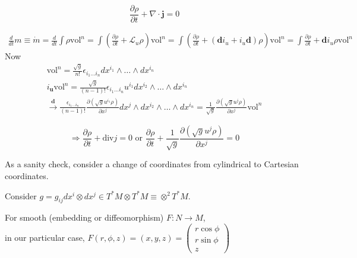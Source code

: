 \documentclass[twoside,landscape,10pt]{amsart}
\theoremstyle{plain}
\theoremstyle{definition}
\theoremstyle{remark}
\theoremstyle{remark}
\begin{document}
\begin{multicols*}{2}
\begin{equation}
  \frac{ \partial \rho }{ \partial t } + \nabla \cdot \mathbf{j} = 0 
\end{equation}

\[
\begin{gathered}
  \frac{d}{dt} m \equiv \dot{m} = \frac{d}{dt} \int \rho \text{vol}^n = \int \left( \frac{ \partial \rho}{ \partial t} + \mathcal{L}_u \rho \right)\text{vol}^n = \int \left( \frac{ \partial \rho }{ \partial t} + (\mathbf{d}i_u + i_u \mathbf{d})\rho \right)\text{vol}^n = \int \frac{ \partial \rho }{ \partial t} + \mathbf{d}i_u \rho \text{vol}^n 
\end{gathered}
\]
Now
\[
\begin{gathered}
  \text{vol}^n = \frac{ \sqrt{g}}{n!} \epsilon_{i_1 \dots i_n} dx^{i_1} \wedge \dots \wedge dx^{i_n} \\ 
  i_{\mathbf{u}} \text{vol}^n = \frac{ \sqrt{g}}{(n-1)!} \epsilon_{i_1 \dots i_n} u^{i_1} dx^{i_2} \wedge \dots \wedge dx^{i_n} \\
  \xrightarrow{ \mathbf{d}} \frac{ \epsilon_{i_1 \dots i_n}}{ (n-1)!} \frac{ \partial (\sqrt{g} u^{i_1} \rho ) }{ \partial x^j} dx^j \wedge dx^{i_2} \wedge \dots \wedge dx^{i_n} = \frac{1}{\sqrt{g}} \frac{ \partial ( \sqrt{g} u^j \rho ) }{ \partial x^j} \text{vol}^n 
\end{gathered}
\]

\[
\Longrightarrow \frac{ \partial \rho }{ \partial t} + \text{div} j = 0 \text{ or } \frac{ \partial \rho}{ \partial t} + \frac{1}{\sqrt{g}} \frac{ \partial ( \sqrt{g} u^j \rho ) }{ \partial x^j} = 0 
\]

As a sanity check, consider a change of coordinates from cylindrical to Cartesian coordinates.  

Consider $g=  g_{ij} dx^i \otimes dx^j \in T^*M \otimes T^*M \equiv \otimes^2 T^*M$.  

For smooth (embedding or diffeomorphism) $F : N\to M$, \\
in our particular case, $F(r,\phi,z) = (x,y,z) = \left( \begin{matrix} r\cos{\phi } \\ r\sin{\phi} \\ z \end{matrix} \right)$


\end{multicols*}
\end{document}
